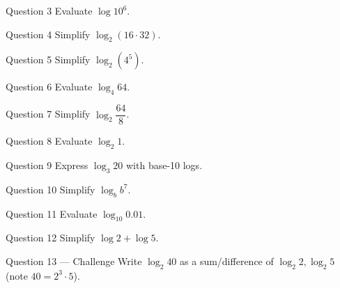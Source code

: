 \documentclass[11pt]{article}
\begin{document}
\begin{qbox}{Question 3}
Evaluate $\log 10^6$.\workspace{2.4cm}
\end{qbox}

\begin{qbox}{Question 4}
Simplify $\log_2(16\cdot32)$.\workspace{2.4cm}
\end{qbox}

\begin{qbox}{Question 5}
Simplify $\log_2(4^5)$.\workspace{2.4cm}
\end{qbox}

\begin{qbox}{Question 6}
Evaluate $\log_4 64$.\workspace{2.4cm}
\end{qbox}

\begin{qbox}{Question 7}
Simplify $\log_2\dfrac{64}{8}$.\workspace{2.4cm}
\end{qbox}

\begin{qbox}{Question 8}
Evaluate $\log_2 1$.\workspace{2.4cm}
\end{qbox}

\begin{qbox}{Question 9}
Express $\log_3 20$ with base-10 logs.\workspace{2.4cm}
\end{qbox}

\begin{qbox}{Question 10}
Simplify $\log_b b^7$.\workspace{2.4cm}
\end{qbox}

\begin{qbox}{Question 11}
Evaluate $\log_{10} 0.01$.\workspace{2.4cm}
\end{qbox}

\begin{qbox}{Question 12}
Simplify $\log 2+\log 5$.\workspace{2.4cm}
\end{qbox}

\begin{qbox}{Question 13 --- Challenge}
Write $\log_2 40$ as a sum/difference of $\log_2 2,\log_2 5$ (note $40=2^3\cdot5$).\workspace{3cm}
\end{qbox}

\clearpage
{}
\end{document}
